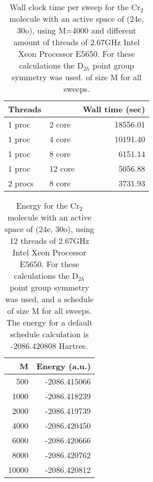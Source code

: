 \documentclass[letterpaper,12pt,notitlepage]{article}
\begin{document}
\begin{table}
		\begin{center}
	\begin{tabular}{llr}
  \hline
  \hline
  Threads && Wall time (sec)\\
  \hline
1 proc &2 core  &18556.01\\
1 proc &4 core  &10191.40\\
1 proc &8 core  &6151.14\\
1 proc &12 core &5056.88\\
2 procs &8 core &3731.93\\
  \hline
  \hline
	\end{tabular}
		\end{center}
	\caption{Wall clock time per sweep for the Cr$_2$ molecule with an
	active space of (24e, 30o), using M=4000 and different amount of
	threads of 2.67GHz Intel Xeon Processor E5650. For these calculations
	the D$_{2h}$ point group symmetry was used.  of size M for all sweeps.
	} \label{tab:timingthread}
\end{table}
\begin{table}
\begin{center}
 \begin{tabular}{rr}
  \hline
  \hline
M& Energy (a.u.)\\
\hline
500     &-2086.415066\\
1000	&-2086.418239\\
2000	&-2086.419739\\
4000	&-2086.420450\\
6000	&-2086.420666\\
8000	&-2086.420762\\
10000	&-2086.420812\\
\hline
  \hline
 \end{tabular}
\end{center}
\caption{Energy for  the Cr$_2$ molecule with an active space
of (24e, 30o), using 12 threads of 2.67GHz Intel Xeon Processor E5650. For
these calculations the D$_{2h}$ point group symmetry was used, and a schedule
of size M for all sweeps. The energy for a default schedule calculation
is -2086.420808 Hartree.} \label{tab:timing}
\end{table}
\end{document}
